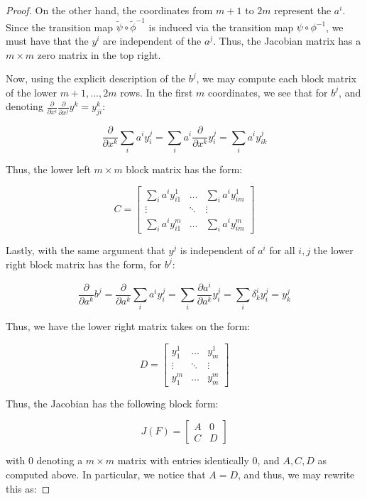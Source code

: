 \documentclass[10pt]{article}
\theoremstyle{nonumberplain}%
\begin{document}
\begin{proof}
On the other hand, the coordinates from $m+1$ to $2m$ represent the $a^i$. Since the transition map  $\tilde{\psi} \circ \tilde{\phi}^{-1}$ is induced via the transition map  $\psi \circ \phi^{-1}$, we must have that the $y^i$ are independent of the $a^j$. Thus, the Jacobian matrix has a $m \times m$ zero matrix in the top right.

Now, using the explicit description of the $b^j$, we may compute each block matrix of the lower $m+1,...,2m$ rows. In the first $m$ coordinates, we see that for $b^j$, and denoting $\frac{\partial}{\partial x^i} \frac{\partial}{\partial x^j} y^k = y^k_{ji}$:

$$\frac{\partial}{\partial x^k} \sum_i a^i y^j_i = \sum_i a^i \frac{\partial}{\partial x^k} y^j_i =\sum_i a^i y^j_{ik} $$

Thus, the lower left $m\times m$ block matrix has the form:

$$ C = \begin{bmatrix} \sum_i a^i y^1_{i1} & \hdots & \sum_i a^i y^1_{im}\\ \vdots & \ddots & \vdots \\  \sum_i a^i y^m_{i1} & \hdots &  \sum_i a^i y^m_{im}   \end{bmatrix}$$

Lastly, with the same argument that $y^j$ is independent of $a^i$ for all $i,j$ the lower right block matrix has the form, for $b^j$:

$$ \frac{\partial}{\partial a^k} b^j =  \frac{\partial}{\partial a^k}  \sum_i a^i y^j_i =  \sum_i\frac{\partial a^i}{\partial a^k}y^j_i  = \sum_i \delta^i_k y^j_i = y^j_k $$

Thus, we have the lower right matrix takes on the form:

$$ D =  \begin{bmatrix} y^1_1 & \hdots & y^1_m\\ \vdots & \ddots & \vdots \\ y^m_1 & \hdots &y^m_m   \end{bmatrix}$$

Thus, the Jacobian has the following block form:

$$ J(F) = \begin{bmatrix} A & 0 \\ C & D \end{bmatrix}$$

with $0$ denoting a $m \times m$ matrix with entries identically $0$, and $A, C, D$ as computed above. In particular, we notice that $A = D$, and thus, we may rewrite this as:


\end{proof}
\end{document}

